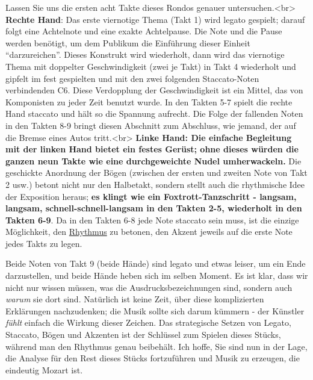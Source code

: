 Lassen Sie uns die ersten acht Takte dieses Rondos genauer untersuchen.<br>
\textbf{Rechte Hand}: Das erste viernotige Thema (Takt 1) wird legato gespielt; darauf folgt eine Achtelnote und eine exakte Achtelpause.
Die Note und die Pause werden benötigt, um dem Publikum die Einführung dieser Einheit \enquote{darzureichen}.
Dieses Konstrukt wird wiederholt, dann wird das viernotige Thema mit doppelter Geschwindigkeit (zwei je Takt) in Takt 4 wiederholt und gipfelt im fest gespielten und mit den zwei folgenden Staccato-Noten verbindenden C6.
Diese Verdopplung der Geschwindigkeit ist ein Mittel, das von Komponisten zu jeder Zeit benutzt wurde.
In den Takten 5-7 spielt die rechte Hand staccato und hält so die Spannung aufrecht.
Die Folge der fallenden Noten in den Takten 8-9 bringt diesen Abschnitt zum Abschluss, wie jemand, der auf die Bremse eines Autos tritt.<br>
\textbf{Linke Hand: Die einfache Begleitung mit der linken Hand bietet ein festes Gerüst; ohne dieses würden die ganzen neun Takte wie eine durchgeweichte Nudel umherwackeln.}
Die geschickte Anordnung der Bögen (zwischen der ersten und zweiten Note von Takt 2 usw.) betont nicht nur den Halbetakt, sondern stellt auch die rhythmische Idee der Exposition heraus; \textbf{es klingt wie ein Foxtrott-Tanzschritt - langsam, langsam, schnell-schnell-langsam in den Takten 2-5, wiederholt in den Takten 6-9}.
Da in den Takten 6-8 jede Note staccato sein muss, ist die einzige Möglichkeit, den \hyperlink{c1iii1b}{Rhythmus} zu betonen, den Akzent jeweils auf die erste Note jedes Takts zu legen.

Beide Noten von Takt 9 (beide Hände) sind legato und etwas leiser, um ein Ende darzustellen, und beide Hände heben sich im selben Moment.
Es ist klar, dass wir nicht nur wissen müssen, was die Ausdrucksbezeichnungen sind, sondern auch \textit{warum} sie dort sind.
Natürlich ist keine Zeit, über diese komplizierten Erklärungen nachzudenken; die Musik sollte sich darum kümmern - der Künstler \textit{fühlt} einfach die Wirkung dieser Zeichen.
Das strategische Setzen von Legato, Staccato, Bögen und Akzenten ist der Schlüssel zum Spielen dieses Stücks, während man den Rhythmus genau beibehält.
Ich hoffe, Sie sind nun in der Lage, die Analyse für den Rest dieses Stücks fortzuführen und Musik zu erzeugen, die eindeutig Mozart ist.

